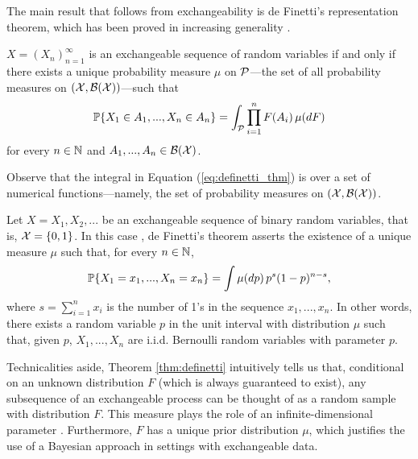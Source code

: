 The main result that follows from exchangeability is de Finetti's representation theorem, which has been proved in increasing generality \cite{deFinetti:1930:RepTheorem, HewittSavage:1955:rep_theorem, DiaconisFreedman:1978:Generalizations}.  

\begin{theorem}[de Finneti] \label{thm:definetti}
	$X = (X_n)_{n=1}^{\infty}$ is an exchangeable sequence of random variables if and only if there exists a unique probability measure $\mu$ on $\mathcal{P}$---the set of all probability measures on $(\mathcal{X}, \mathcal{B}(\mathcal{X}))$---such that
	\begin{equation} \label{eq:definetti_thm}
		\mathbb{P} \{ X_1 \in A_1, ..., X_n \in A_n \} = \int_{\mathcal{P}}  \prod_{i=1}^n F(A_i) \, \mu(dF)
	\end{equation}
	for every $n \in \mathbb{N}$ and $A_1, ..., A_n \in \mathcal{B}(\mathcal{X})$.
\end{theorem}

Observe that the integral in Equation (\ref{eq:definetti_thm}) is over a set of numerical functions---namely, the set of probability measures on $(\mathcal{X}, \mathcal{B}(\mathcal{X}))$. 


\begin{mdframed}[backgroundcolor=mygray] 
	\begin{example} \label{ex:binary_definetti}
		Let $X = X_1, X_2, ...$ be an exchangeable sequence of binary random variables, that is, $\mathcal{X} = \{0, 1\}$. In this case \cite[see][p.111]{Diaconis:1988:PartialExchang}, de Finetti's theorem asserts the existence of a unique measure $\mu$ such that, for every $n \in \mathbb{N}$,
		\begin{equation*}
			\mathbb{P} \{ X_1 = x_1, ..., X_n = x_n \} = \int \mu(dp) \, p^s (1-p)^{n-s},
		\end{equation*}
		where $s = \sum_{i=1}^n x_i$ is the number of 1's in the sequence $x_1, ..., x_n$. In other words, there exists a random variable $p$ in the unit interval with distribution $\mu$ such that, given $p$, $X_1, ..., X_n$ are i.i.d. Bernoulli random variables with parameter $p$.
	\end{example}
\end{mdframed}



Technicalities aside, Theorem \ref{thm:definetti} intuitively tells us that, conditional on an unknown distribution $F$ (which is always guaranteed to exist), any subsequence of an exchangeable process can be thought of as a random sample with distribution $F$. This measure plays the role of an infinite-dimensional parameter \cite[][Ch.~4.3]{BernardoSmith:1994:BayesianTheory}. Furthermore, $F$ has a unique prior distribution $\mu$, which justifies the use of a Bayesian approach in settings with exchangeable data. \\


